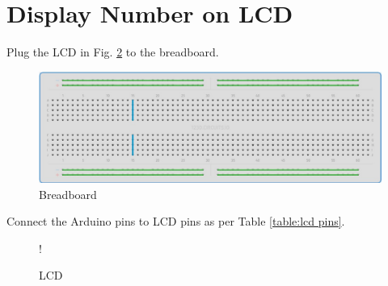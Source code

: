 \documentclass[journal,12pt,twocolumn]{IEEEtran}
\begin{document}
\section{Display Number on LCD}
%
\begin{problem}
Plug the LCD in Fig. \ref{fig:lcd} to the breadboard.
\end{problem}
%

%
\begin{figure}
\centering
\includegraphics[width=\columnwidth]{./figs/breadboard.eps}
\caption{Breadboard}
	\label{fig:breadboard}
\end{figure}


\begin{problem}
Connect the Arduino pins to LCD pins as per Table \ref{table:lcd pins}.
\end{problem}
%
%
\begin{figure}[!h]
\begin{center}
\resizebox {\columnwidth} {!} {

}
\end{center}
\caption{LCD}
\label{fig:lcd}
\end{figure}
\end{document}
